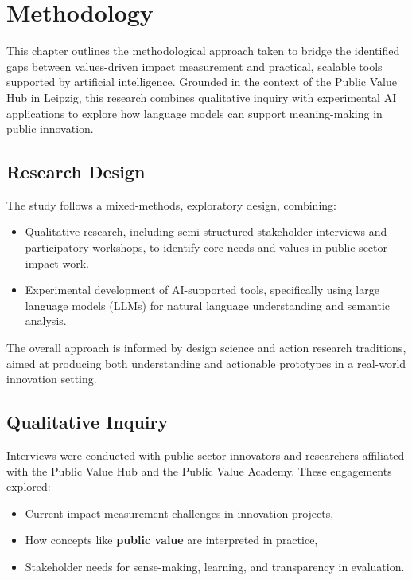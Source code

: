 \chapter{Methodology}\label{ch:methodology}

This chapter outlines the methodological approach taken to bridge the identified gaps between values-driven impact measurement and practical, scalable tools supported by artificial intelligence.
Grounded in the context of the Public Value Hub in Leipzig, this research combines qualitative inquiry with experimental AI applications to explore how language models can support meaning-making in public innovation.

\section{Research Design}\label{sec:research-design}

The study follows a mixed-methods, exploratory design, combining:

\begin{itemize}
    \item Qualitative research, including semi-structured stakeholder interviews and participatory workshops, to identify core needs and values in public sector impact work.
    \item Experimental development of AI-supported tools, specifically using large language models (LLMs) for natural language understanding and semantic analysis.
\end{itemize}

The overall approach is informed by design science and action research traditions, aimed at producing both understanding and actionable prototypes in a real-world innovation setting.

\section{Qualitative Inquiry}\label{sec:qualitative-inquiry}

Interviews were conducted with public sector innovators and researchers affiliated with the Public Value Hub and the Public Value Academy.
These engagements explored:

\begin{itemize}
    \item Current impact measurement challenges in innovation projects,
    \item How concepts like \textbf{public value} are interpreted in practice,
    \item Stakeholder needs for sense-making, learning, and transparency in evaluation.
\end{itemize}

